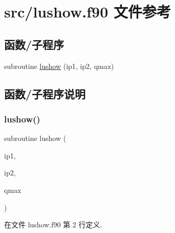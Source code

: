 \hypertarget{lushow_8f90}{}\section{src/lushow.f90 文件参考}
\label{lushow_8f90}
\subsection*{函数/子程序}
\begin{DoxyCompactItemize}
\item 
subroutine \mbox{\hyperlink{lushow_8f90_ac3b103459060e67e9e881ddad4b52cef}{lushow}} (ip1, ip2, qmax)
\end{DoxyCompactItemize}


\subsection{函数/子程序说明}
\mbox{\label{lushow_8f90_ac3b103459060e67e9e881ddad4b52cef}} 
\subsubsection{\texorpdfstring{lushow()}{lushow()}}
{\footnotesize\ttfamily subroutine lushow (\begin{DoxyParamCaption}\item[{}]{ip1,  }\item[{}]{ip2,  }\item[{}]{qmax }\end{DoxyParamCaption})}



在文件 lushow.\+f90 第 2 行定义.

